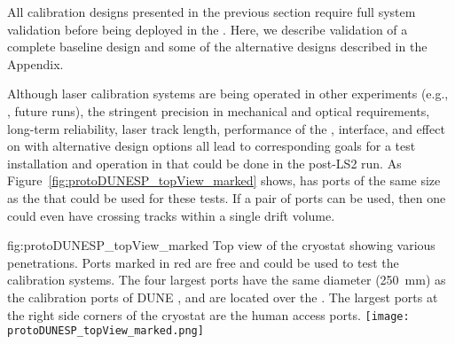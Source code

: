 

All calibration designs presented in the previous section require full system validation before being deployed in the  . 
Here, we describe validation of a complete baseline design and some of the alternative designs described in the Appendix.

Although laser calibration systems are being operated
in other  experiments (e.g., , future  runs), the stringent precision 
in mechanical and optical requirements, long-term reliability, laser track length, performance of the ,  interface, and effect on \efield with alternative design options all lead to corresponding goals for a test installation and operation in  that could be done in the post-LS2 run. As Figure~\ref{fig:protoDUNESP_topView_marked} shows,  has ports of the same size as the   that could be used for these tests. If a pair of ports can be used, then one could even have crossing tracks within a single drift volume. 

\begin{dunefigure}{fig:protoDUNESP_topView_marked}
{Top view of the  cryostat showing various penetrations. Ports marked in red are free and could be used to test the calibration systems. The four largest ports have the same diameter (\SI{250}{\milli\m}) as the calibration ports of DUNE , and are located over the . The largest ports at the right side corners of the cryostat are the human access ports.}
\texttt{[image: protoDUNESP\_topView\_marked.png]}
\end{dunefigure}

